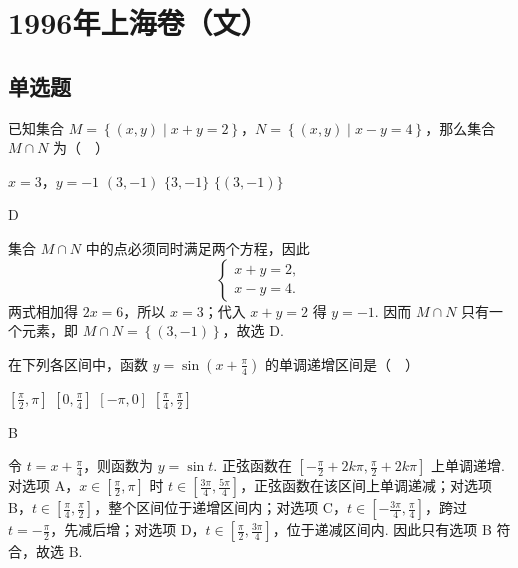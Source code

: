 \documentclass[UTF8,a4paper,oneside,11pt]{ctexbook}
\begin{document}
\mainmatter

\chapter{1996年上海卷（文）}
\section{单选题}

\begin{problem}
已知集合 \(M=\left\{(x,y)\mid x+y=2\right\}\)，\(N=\left\{(x,y)\mid x-y=4\right\}\)，那么集合 \(M\cap N\) 为（\(\quad\)）

\choices
    {\(x=3\)，\(y=-1\)}
    {\((3,-1)\)}
    {\(\{3,-1\}\)}
    {\(\{(3,-1)\}\)}
\end{problem}

\begin{answer}
D
\end{answer}

\begin{solution}
集合 \(M\cap N\) 中的点必须同时满足两个方程，因此
\[
\begin{cases}
x+y=2,\\
x-y=4.
\end{cases}
\]
两式相加得 \(2x=6\)，所以 \(x=3\)；代入 \(x+y=2\) 得 \(y=-1\). 因而 \(M\cap N\) 只有一个元素，即 \(M\cap N=\left\{(3,-1)\right\}\)，故选 D.
\end{solution}

\begin{problem}
在下列各区间中，函数 \(y=\sin\left(x+\frac{\pi}{4}\right)\) 的单调递增区间是（\(\quad\)）

\choices
    {\(\left[\frac{\pi}{2},\pi\right]\)}
    {\(\left[0,\frac{\pi}{4}\right]\)}
    {\(\left[-\pi,0\right]\)}
    {\(\left[\frac{\pi}{4},\frac{\pi}{2}\right]\)}
\end{problem}

\begin{answer}
B
\end{answer}

\begin{solution}
令 \(t=x+\frac{\pi}{4}\)，则函数为 \(y=\sin t\). 正弦函数在
\(\left[-\frac{\pi}{2}+2k\pi,\frac{\pi}{2}+2k\pi\right]\)
上单调递增. 对选项 A，\(x\in\left[\frac{\pi}{2},\pi\right]\) 时
\(t\in\left[\frac{3\pi}{4},\frac{5\pi}{4}\right]\)，正弦函数在该区间上单调递减；对选项 B，\(t\in\left[\frac{\pi}{4},\frac{\pi}{2}\right]\)，整个区间位于递增区间内；对选项 C，\(t\in\left[-\frac{3\pi}{4},\frac{\pi}{4}\right]\)，跨过 \(t=-\frac{\pi}{2}\)，先减后增；对选项 D，\(t\in\left[\frac{\pi}{2},\frac{3\pi}{4}\right]\)，位于递减区间内. 因此只有选项 B 符合，故选 B.
\end{solution}
\end{document}
